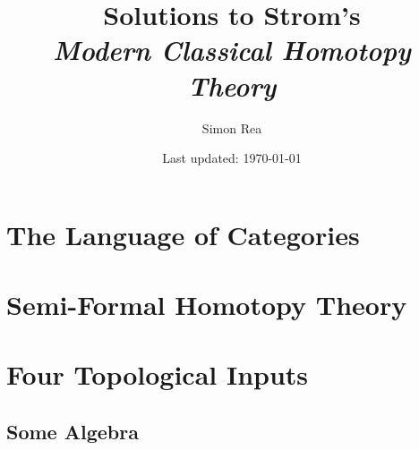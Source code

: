 \documentclass[12pt,twoside]{book}
\title{Solutions to Strom's\\\textit{Modern Classical Homotopy Theory}}
\author{Simon Rea}
\date{Last updated: \today}
\theoremstyle{definition}
\theoremstyle{remark}
\begin{document}
\frontmatter
\maketitle
\tableofcontents

\mainmatter
\part{The Language of Categories}



\part{Semi-Formal Homotopy Theory}



\part{Four Topological Inputs}


\appendix
\chapter{Some Algebra}

\end{document}
